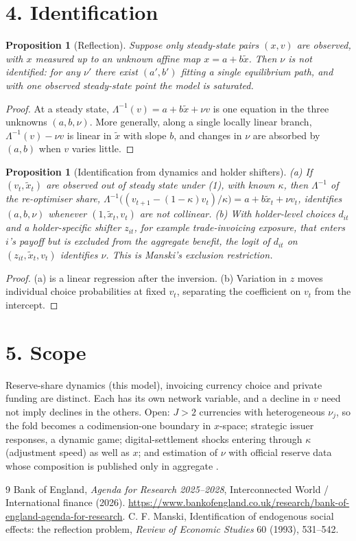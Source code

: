 \documentclass[11pt]{article}
\newtheorem{proposition}[theorem]{Proposition}
\theoremstyle{definition}
\begin{document}
\section*{4. Identification}
\begin{proposition}[Reflection]\label{prop:refl}
Suppose only steady-state pairs $(x,v)$ are observed, with $x$ measured up to an unknown affine map $x=a+b\tilde x$. Then
$\nu$ is not identified: for any $\nu'$ there exist $(a',b')$ fitting a single equilibrium path, and with one observed
steady-state point the model is saturated.
\end{proposition}
\begin{proof}
At a steady state, $\Lambda^{-1}(v)=a+b\tilde x+\nu v$ is one equation in the three unknowns $(a,b,\nu)$. More generally,
along a single locally linear branch, $\Lambda^{-1}(v)-\nu v$ is linear in $\tilde x$ with slope $b$, and changes in $\nu$
are absorbed by $(a,b)$ when $v$ varies little.
\end{proof}
\begin{proposition}[Identification from dynamics and holder shifters]\label{prop:id}
(a) If $(v_t,\tilde x_t)$ are observed out of steady state under (1), with known $\kappa$, then $\Lambda^{-1}$ of the
re-optimiser share, $\Lambda^{-1}\bigl((v_{t+1}-(1-\kappa)v_t)/\kappa\bigr)=a+b\tilde x_t+\nu v_t$, identifies $(a,b,\nu)$
whenever $(1,\tilde x_t,v_t)$ are not collinear.
(b) With holder-level choices $d_{it}$ and a holder-specific shifter $z_{it}$, for example trade-invoicing exposure, that
enters $i$'s payoff but is excluded from the aggregate benefit, the logit of $d_{it}$ on $(z_{it},\tilde x_t,v_t)$ identifies
$\nu$. This is Manski's exclusion restriction.
\end{proposition}
\begin{proof}
(a) is a linear regression after the inversion. (b) Variation in $z$ moves individual choice probabilities at fixed
$v_t$, separating the coefficient on $v_t$ from the intercept.
\end{proof}

\section*{5. Scope}
Reserve-share dynamics (this model), invoicing currency choice and private funding are distinct. Each has its own network
variable, and a decline in $v$ need not imply declines in the others. Open: $J>2$ currencies with heterogeneous $\nu_j$, so
the fold becomes a codimension-one boundary in $x$-space; strategic issuer responses, a dynamic game; digital-settlement
shocks entering through $\kappa$ (adjustment speed) as well as $x$; and estimation of $\nu$ with official reserve data
whose composition is published only in aggregate \cite{boe}.

\begin{thebibliography}{9}
 Bank of England, \emph{Agenda for Research 2025--2028}, Interconnected World / International finance (2026). \url{https://www.bankofengland.co.uk/research/bank-of-england-agenda-for-research}.
 C. F. Manski, Identification of endogenous social effects: the reflection problem, \emph{Review of Economic Studies} 60 (1993), 531--542.
\end{thebibliography}
\end{document}
